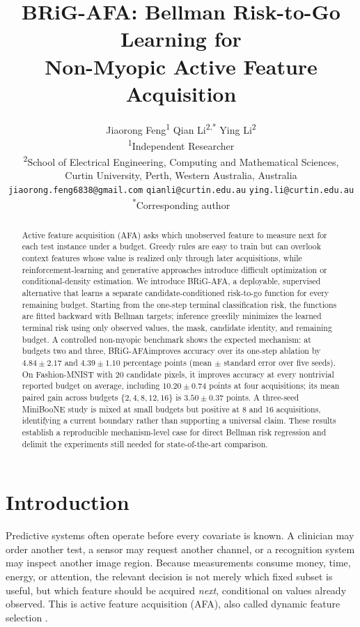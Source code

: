 \documentclass[10pt]{article}
\title{\textbf{BRiG-AFA: Bellman Risk-to-Go Learning for\\Non-Myopic Active Feature Acquisition}}
\author{Jiaorong Feng\textsuperscript{1} \quad Qian Li\textsuperscript{2,*} \quad Ying Li\textsuperscript{2}\\[5pt]
{\small \textsuperscript{1}Independent Researcher}\\
{\small \textsuperscript{2}School of Electrical Engineering, Computing and Mathematical Sciences,}\\
{\small Curtin University, Perth, Western Australia, Australia}\\[4pt]
{\small \texttt{jiaorong.feng6838@gmail.com} \quad \texttt{qianli@curtin.edu.au} \quad \texttt{ying.li@curtin.edu.au}}\\[2pt]
{\small \textsuperscript{*}Corresponding author}}
\date{}
\newcommand{\method}{BRiG-AFA}
\begin{document}
\maketitle

\begin{abstract}
Active feature acquisition (AFA) asks which unobserved feature to measure next for each test instance under a budget. Greedy rules are easy to train but can overlook context features whose value is realized only through later acquisitions, while reinforcement-learning and generative approaches introduce difficult optimization or conditional-density estimation. We introduce \method, a deployable, supervised alternative that learns a separate candidate-conditioned risk-to-go function for every remaining budget. Starting from the one-step terminal classification risk, the functions are fitted backward with Bellman targets; inference greedily minimizes the learned terminal risk using only observed values, the mask, candidate identity, and remaining budget. A controlled non-myopic benchmark shows the expected mechanism: at budgets two and three, \method improves accuracy over its one-step ablation by $4.84\pm2.17$ and $4.39\pm1.10$ percentage points (mean $\pm$ standard error over five seeds). On Fashion-MNIST with 20 candidate pixels, it improves accuracy at every nontrivial reported budget on average, including $10.20\pm0.74$ points at four acquisitions; its mean paired gain across budgets $\{2,4,8,12,16\}$ is $3.50\pm0.37$ points. A three-seed MiniBooNE study is mixed at small budgets but positive at 8 and 16 acquisitions, identifying a current boundary rather than supporting a universal claim. These results establish a reproducible mechanism-level case for direct Bellman risk regression and delimit the experiments still needed for state-of-the-art comparison.
\end{abstract}

\section{Introduction}
Predictive systems often operate before every covariate is known. A clinician may order another test, a sensor may request another channel, or a recognition system may inspect another image region. Because measurements consume money, time, energy, or attention, the relevant decision is not merely which fixed subset is useful, but which feature should be acquired \emph{next}, conditional on values already observed. This is active feature acquisition (AFA), also called dynamic feature selection \citep{shim2018jafa,ma2019eddi,li2021gsm,norcliffe2025sefa}.
\end{document}
